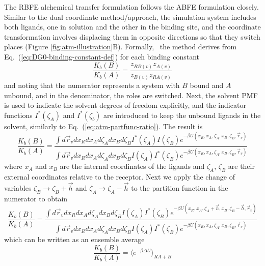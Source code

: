 \documentclass[9pt,bestpractices]{livecoms}
\begin{document}
The RBFE alchemical transfer formulation follows the ABFE formulation closely. Similar to the dual coordinate method/approach, the simulation system includes both ligands, one in solution and the other in the binding site, and the coordinate transformation involves displacing them in opposite directions so that they switch places (Figure \ref{fig:atm-illustration}B). Formally,~\cite{azimi2022relative} the method derives from Eq.~(\ref{eq:DG0-binding-constant-def}) for each binding constant
\begin{equation}
\frac{K_b(B)}{K_b(A)} = \frac{z_{RB(v)} z_{A(v)}}{z_{B(v)} z_{RA(v)}}
\end{equation}
and noting that the numerator represents a system with $B$ bound and $A$ unbound, and in the denominator, the roles are switched. Next, the solvent PMF is used to indicate the solvent degrees of freedom explicitly, and the indicator functions $I^\ast(\zeta_A)$ and $I^\ast(\zeta_b)$ are introduced to keep the unbound ligands in the solvent, similarly to Eq.~(\ref{eq:atm-partfunc-ratio}). The result is
\begin{equation}\label{eq:atm-partfunc-ratio-rbfe-1}
  \frac{K_b(B)}{K_b(A)} = \frac{
    \int d\vec{r}_v dx_R dx_A d\zeta_A dx_B d\zeta_B I^\ast(\zeta_A) I(\zeta_B)  e^{-\beta U(x_R, x_A, \zeta_A, x_B, \zeta_B, \vec{r}_v)}
  }{
    \int d\vec{r}_v dx_R dx_A d\zeta_A dx_B d\zeta_B I(\zeta_A) I^\ast(\zeta_B)  e^{-\beta U(x_R, x_A, \zeta_A, x_B, \zeta_B, \vec{r}_v)}
  }
\end{equation}
where $x_A$ and $x_B$ are the internal coordinates of the ligands and $\zeta_A$, $\zeta_B$ are their external coordinates relative to the receptor.  Next we apply the change of variables $\zeta_B \rightarrow \zeta_B + \vec{h}$ and $\zeta_A \rightarrow \zeta_A - \vec{h}$ to the partition function in the numerator to obtain
\begin{equation}\label{eq:atm-partfunc-ratio-rbfe-2}
  \frac{K_b(B)}{K_b(A)} = \frac{
    \int d\vec{r}_v dx_R dx_A d\zeta_A dx_B d\zeta_B I(\zeta_A) I^\ast(\zeta_B)  e^{-\beta U(x_R, x_A, \zeta_A + \vec{h}, x_B, \zeta_B - \vec{h}, \vec{r}_v)}
  }{
    \int d\vec{r}_v dx_R dx_A d\zeta_A dx_B d\zeta_B I(\zeta_A) I^\ast(\zeta_B)  e^{-\beta U(x_R, x_A, \zeta_A, x_B, \zeta_B, \vec{r}_v)}
  }
\end{equation}
which can be written as an ensemble average
\begin{equation}\label{eq:atm-partfunc-ratio-rbfe-average}
\frac{K_b(B)}{K_b(A)} = \langle e^{-\beta \Delta U}\rangle_{RA+B}
\end{equation}
\end{document}
